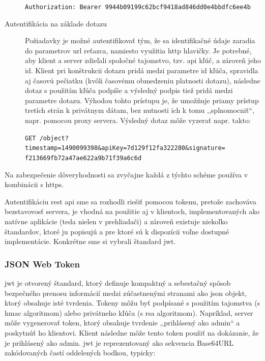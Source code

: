 \begin{description}
  \texttt{Authorization: Bearer 9944b09199c62bcf9418ad846dd0e4bbdfc6ee4b}
  
\item[Autentifikácia na základe dotazu] Požiadavky je možné autentifikovať tým,
  že sa identifikačné údaje zaradia do parametrov \acrshort{url} reťazca,
  namiesto využitia \acrshort{http} hlavičky. Je potrebné, aby klient a server
  zdieľali spoločné tajomstvo, tzv. \acrshort{api} kľúč, a zároveň jeho
  \acrshort{id}. Klient pri konštrukcii dotazu pridá medzi parametre
  \acrshort{id} kľúča, spravidla aj časovú pečiatku (kvôli časovému obmedzeniu
  platnosti dotazu), následne dotaz s použitím kľúča podpíše a výsledný podpis
  tiež pridá medzi parametre dotazu. Výhodou tohto prístupu je, že umožňuje
  priamy prístup tretích strán k privátnym dátam, bez nutnosti ich k tomu
  ,,splnomocniť``, napr. pomocou proxy servera. Výsledný dotaz môže vyzerať
  napr. takto:

  \texttt{GET /object?timestamp=1490099398\&apiKey=7d129f12fa322280\&signature=
    \\f213669fb72a47ae622a9b71f39a6c6d}
\end{description}

Na zabezpečenie dôveryhodnosti sa zvyčajne každá z týchto schéme používa v
kombinácii s \acrshort{https}.

Autentifikáciu \acrshort{rest} \acrshort{api} sme sa rozhodli riešiť pomocou
tokenu, pretože zachováva bezstavovosť servera, je vhodná na použitie aj v
klientoch, implementovaných ako natívne aplikácie (teda nielen v prehliadači) a
zároveň existuje niekoľko štandardov, ktoré ju popisujú a pre ktoré sú k
dispozícii voľne dostupné implementácie. Konkrétne sme si vybrali štandard
\acrfull{jwt}.

\subsubsection{JSON Web Token}

\acrlong{jwt} je otvorený štandard, ktorý definuje kompaktný a sebestačný spôsob
bezpečného prenosu informácií medzi zúčastnenými stranami ako \acrshort{json}
objekt, ktorý obsahuje isté tvrdenia. Tokeny môžu byť podpísané s použitím
tajomstva (s \acrshort{hmac} algoritmom) alebo privátneho kľúča (s
\acrshort{rsa} algoritmom). Napríklad, server môže vygenerovať token, ktorý
obsahuje tvrdenie ,,prihlásený ako admin`` a poskytnúť ho klientovi. Klient
následne môže tento token použiť na dokázanie, že je prihlásený ako admin.
\acrshort{jwt} je reprezentovaný ako sekvencia Base64URL zakódovaných častí
oddelených bodkou, typicky:

